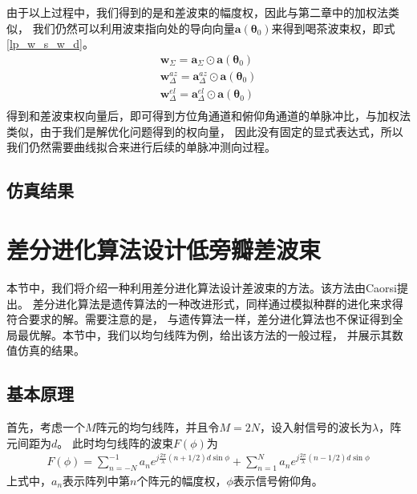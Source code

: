 \documentclass[master]{thesis-uestc}
\begin{document}
由于以上过程中，我们得到的是和差波束的幅度权，因此与第二章中的加权法类似，
我们仍然可以利用波束指向处的导向向量$\bm{a}(\bm{\theta}_0)$来得到喝茶波束权，即式\eqref{lp_w_s_w_d}。
\begin{subequations}\label{lp_w_s_w_d}
    \begin{align}
        \bm{w}_\Sigma = \bm{a}_\Sigma \odot \bm{a}(\bm{\theta}_0) \\
        \bm{w}_\Delta^{az} = \bm{a}_\Delta^{az} \odot \bm{a}(\bm{\theta}_0) \\
        \bm{w}_\Delta^{el} = \bm{a}_\Delta^{el} \odot \bm{a}(\bm{\theta}_0) \\
    \end{align}
\end{subequations}
得到和差波束权向量后，即可得到方位角通道和俯仰角通道的单脉冲比，与加权法类似，由于我们是解优化问题得到的权向量，
因此没有固定的显式表达式，所以我们仍然需要曲线拟合来进行后续的单脉冲测向过程。

\subsection{仿真结果}


\section{差分进化算法设计低旁瓣差波束}
本节中，我们将介绍一种利用差分进化算法设计差波束的方法。该方法由Caorsi提出\cite{Caorsi}。
差分进化算法是遗传算法的一种改进形式，同样通过模拟种群的进化来求得符合要求的解。需要注意的是，
与遗传算法一样，差分进化算法也不保证得到全局最优解。本节中，我们以均匀线阵为例，给出该方法的一般过程，
并展示其数值仿真的结果。

\subsection{基本原理}
首先，考虑一个$M$阵元的均匀线阵，并且令$M=2N$，设入射信号的波长为$\lambda$，阵元间距为$d$。
此时均匀线阵的波束$F(\phi)$为
\begin{equation}\label{de_pattern_fromula}
    \begin{aligned}
        F(\phi) = \sum_{n=-N}^{-1}a_ne^{j\frac{2\pi}{\lambda}\left(n+1/2\right)d\sin\phi} +
        \sum_{n=1}^{N}a_ne^{j\frac{2\pi}{\lambda}\left(n-1/2\right)d\sin\phi}
    \end{aligned}
\end{equation}
上式中，$a_n$表示阵列中第$n$个阵元的幅度权，$\phi$表示信号俯仰角。
\end{document}
